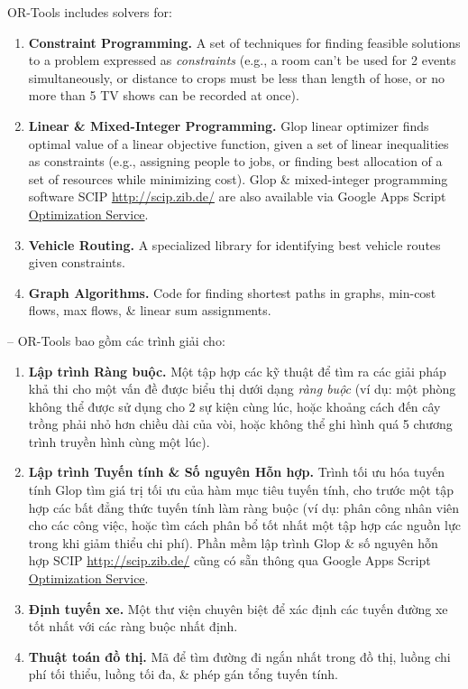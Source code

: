 \documentclass{article}
\begin{document}
OR-Tools includes solvers for:
\begin{enumerate}
    \item {\bf Constraint Programming.} A set of techniques for finding feasible solutions to a problem expressed as {\it constraints} (e.g., a room can't be used for 2 events simultaneously, or distance to crops must be less than length of hose, or no more than 5 TV shows can be recorded at once).
    \item {\bf Linear \& Mixed-Integer Programming.} Glop linear optimizer finds optimal value of a linear objective function, given a set of linear inequalities as constraints (e.g., assigning people to jobs, or finding best allocation of a set of resources while minimizing cost). Glop \& mixed-integer programming software SCIP \url{http://scip.zib.de/} are also available via Google Apps Script \href{https://developers.google.com/apps-script/reference/optimization}{Optimization Service}.
    \item {\bf Vehicle Routing.} A specialized library for identifying best vehicle routes given constraints.
    \item {\bf Graph Algorithms.} Code for finding shortest paths in graphs, min-cost flows, max flows, \& linear sum assignments.
\end{enumerate}
-- OR-Tools bao gồm các trình giải cho:
\begin{enumerate}
    \item {\bf Lập trình Ràng buộc.} Một tập hợp các kỹ thuật để tìm ra các giải pháp khả thi cho một vấn đề được biểu thị dưới dạng {\it ràng buộc} (ví dụ: một phòng không thể được sử dụng cho 2 sự kiện cùng lúc, hoặc khoảng cách đến cây trồng phải nhỏ hơn chiều dài của vòi, hoặc không thể ghi hình quá 5 chương trình truyền hình cùng một lúc).
    \item {\bf Lập trình Tuyến tính \& Số nguyên Hỗn hợp.} Trình tối ưu hóa tuyến tính Glop tìm giá trị tối ưu của hàm mục tiêu tuyến tính, cho trước một tập hợp các bất đẳng thức tuyến tính làm ràng buộc (ví dụ: phân công nhân viên cho các công việc, hoặc tìm cách phân bổ tốt nhất một tập hợp các nguồn lực trong khi giảm thiểu chi phí). Phần mềm lập trình Glop \& số nguyên hỗn hợp SCIP \url{http://scip.zib.de/} cũng có sẵn thông qua Google Apps Script \href{https://developers.google.com/apps-script/reference/optimization}{Optimization Service}.
    \item {\bf Định tuyến xe.} Một thư viện chuyên biệt để xác định các tuyến đường xe tốt nhất với các ràng buộc nhất định.
    \item {\bf Thuật toán đồ thị.} Mã để tìm đường đi ngắn nhất trong đồ thị, luồng chi phí tối thiểu, luồng tối đa, \& phép gán tổng tuyến tính.
\end{enumerate}
\end{document}
